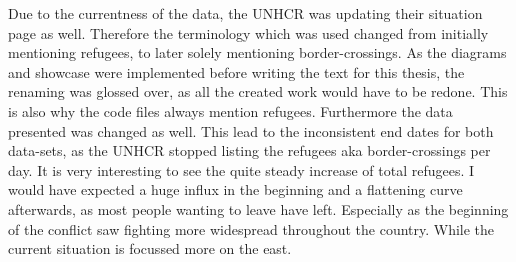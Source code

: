 Due to the currentness of the data, the UNHCR was updating their situation page as well. Therefore the terminology which was used changed from initially mentioning refugees, to later solely mentioning border-crossings. As the diagrams and showcase were implemented before writing the text for this thesis, the renaming was glossed over, as all the created work would have to be redone. This is also why the code files always mention refugees. Furthermore the data presented was changed as well. This lead to the inconsistent end dates for both data-sets, as the UNHCR stopped listing the refugees aka border-crossings per day. It is very interesting to see the quite steady increase of total refugees. I would have expected a huge influx in the beginning and a flattening curve afterwards, as most people wanting to leave have left. Especially as the beginning of the conflict saw fighting more widespread throughout the country. While the current situation is focussed more on the east.
